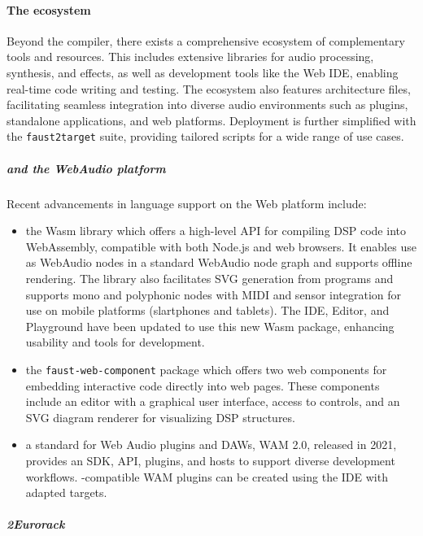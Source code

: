 \paragraph{The \F{} ecosystem}

Beyond the \F{} compiler, there exists a comprehensive ecosystem of complementary tools and resources. This includes
extensive libraries for audio processing, synthesis, and effects, as well as development tools like the \F{} Web IDE,
enabling real-time code writing and testing. The ecosystem also features \F{} architecture files, facilitating seamless
integration into diverse audio environments such as plugins, standalone applications, and web platforms. Deployment is
further simplified with the \texttt{faust2target} suite, providing tailored scripts for a wide range of use cases.

\subparagraph{\F{} and the WebAudio platform}

Recent advancements in \F{} language support on the Web platform include:

\begin{itemize}
\item
  the \F{}Wasm library which offers a high-level API for compiling \F{} DSP code into WebAssembly, compatible with both
  Node.js and web browsers. It enables use as WebAudio nodes in a standard WebAudio node graph and supports offline
  rendering. The library also facilitates SVG generation from \F{} programs and supports mono and polyphonic nodes with
  MIDI and sensor integration for use on mobile platforms (slartphones and tablets). The \F{} IDE, Editor, and
  Playground have been updated to use this new \F{}Wasm package, enhancing usability and tools for \F{} development.
\item
  the \texttt{faust-web-component} package which offers two web components for embedding interactive \F{} code directly
  into web pages. These components include an editor with a graphical user interface, access to controls, and an SVG
  diagram renderer for visualizing DSP structures.
\item
  a standard for Web Audio plugins and DAWs, WAM 2.0, released in 2021, provides an SDK, API, plugins, and hosts to
  support diverse development workflows. \F{}-compatible WAM plugins can be created using the \F{} IDE with adapted
  targets.
\end{itemize}

\subparagraph{\F{}2Eurorack}

